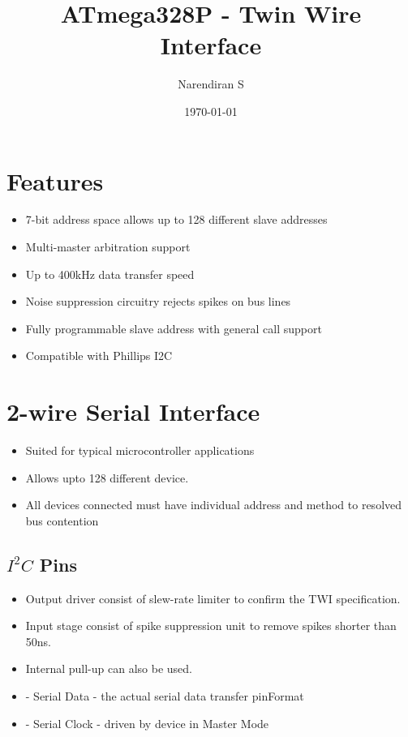 \documentclass{article}
\title{ATmega328P - Twin Wire Interface}
\author{Narendiran S}
\date{\today}
\begin{document}
\maketitle

\section{Features}
\begin{itemize}
    \item 7-bit address space allows up to 128 different slave addresses
    \item Multi-master arbitration support
    \item Up to 400kHz data transfer speed
    \item Noise suppression circuitry rejects spikes on bus lines
    \item Fully programmable slave address with general call support
    \item Compatible with Phillips I­2C
\end{itemize}
\section{2-wire Serial Interface}
\begin{itemize}
    \item Suited for typical microcontroller applications
    \item Allows upto  128 different device.
    \item All devices connected must have individual address and method to resolved bus contention
\end{itemize}

\subsection{\texorpdfstring{$I^2C$}{} Pins}
\begin{itemize}
    \item Output driver consist of slew-rate limiter to confirm the TWI specification.
    \item Input stage consist of spike suppression unit to remove spikes shorter than 50ns.
    \item Internal pull-up can also be used.
    \item {} - Serial Data - the actual serial data transfer pinFormat
    \item {} - Serial Clock - driven by device in Master Mode
\end{itemize}
\end{document}
